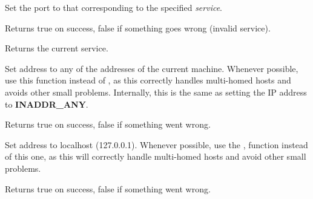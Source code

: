 %
%



Set the port to that corresponding to the specified {\it service}.


Returns true on success, false if something goes wrong
(invalid service).

%
%



Returns the current service.

%
%

\label{wxipv4addressanyaddress}


Set address to any of the addresses of the current machine. Whenever
possible, use this function instead of ,
as this correctly handles multi-homed hosts and avoids other small
problems. Internally, this is the same as setting the IP address
to {\bf INADDR\_ANY}.


Returns true on success, false if something went wrong.

%
%

\label{wxipv4addresslocalhost}


Set address to localhost (127.0.0.1). Whenever possible, use the 
,
function instead of this one, as this will correctly handle multi-homed
hosts and avoid other small problems.


Returns true on success, false if something went wrong.

